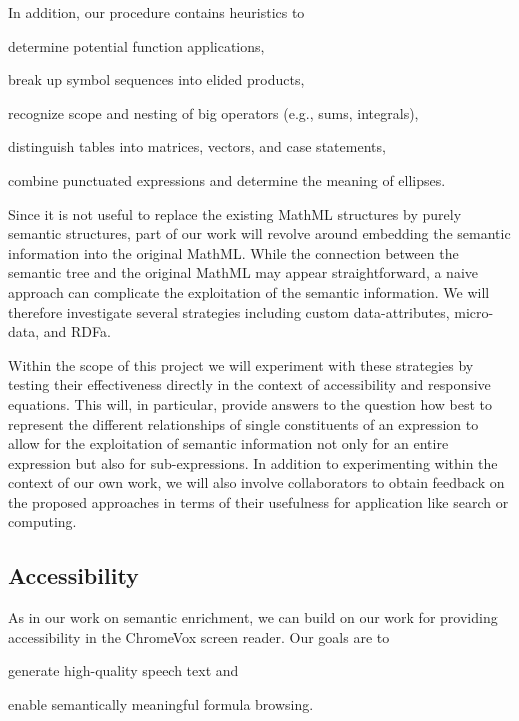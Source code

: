 \documentclass[12pt]{amsart}
\begin{document}
In addition, our procedure contains heuristics to
\begin{inparaenum}
 \item determine potential function applications,
 \item break up symbol sequences into elided products,
 \item recognize scope and nesting of big operators (e.g., sums, integrals),
 \item distinguish tables into matrices, vectors, and case statements,
 \item combine punctuated expressions and determine the meaning of ellipses.
\end{inparaenum}

Since it is not useful to replace the existing MathML structures by purely 
semantic structures, part of our work will revolve around embedding the semantic 
information  into the original MathML. While the connection between the semantic 
tree and the original MathML may appear straightforward, a naive approach can 
complicate the exploitation of the semantic information. We  will therefore 
investigate several strategies including custom data-attributes, micro-data, and 
RDFa.

Within the scope of this project we will experiment with these strategies by 
testing their effectiveness directly in the context of accessibility and 
responsive equations. This will, in particular, provide answers to the question 
how best to represent the different relationships of single constituents of an 
expression to allow for the exploitation of semantic information not only for an 
entire expression but also for sub-expressions. In addition to experimenting 
within the context of our own work, we will also involve collaborators to obtain 
feedback on the proposed approaches in terms of their usefulness for 
application like search or computing.


\subsection{Accessibility}

As in our work on semantic enrichment, we can build on our work for providing 
accessibility in the ChromeVox screen reader. Our goals are to
\begin{inparaenum}[(a)]
 \item generate high-quality speech text and
 \item 
 enable semantically meaningful formula browsing.
\end{inparaenum}
\end{document}
